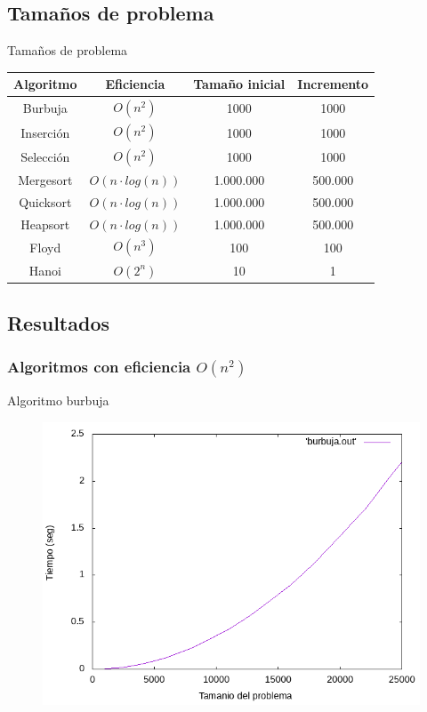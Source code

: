 \documentclass{beamer}
\begin{document}
\subsection{Tamaños de problema}
\begin{frame}[fragile]{Tamaños de problema}
\begin{table}[H]
\centering
\begin{tabular}{|c|c|c|c|}
\hline
\textbf{Algoritmo} & \textbf{Eficiencia} & \textbf{Tamaño inicial} & \textbf{Incremento}\\
\hline
Burbuja & $O(n^2)$ & 1000 & 1000 \\
\hline
Inserción & $O(n^2)$ & 1000 & 1000 \\
\hline
Selección & $O(n^2)$ & 1000 & 1000 \\
\hline
Mergesort & $O(n \cdot log(n))$ & 1.000.000 & 500.000 \\
\hline
Quicksort & $O(n \cdot log(n))$ & 1.000.000 & 500.000 \\
\hline
Heapsort & $O(n \cdot log(n))$ & 1.000.000 & 500.000 \\
\hline
Floyd & $O(n^3)$ & 100 & 100 \\
\hline
Hanoi & $O(2^n)$ & 10 & 1 \\
\hline
\end{tabular}
\end{table}
\end{frame}
\subsection{Resultados}

\subsubsection{Algoritmos con eficiencia $O(n^2)$}

\begin{frame}[fragile]{Algoritmo burbuja}
\begin{figure}[H]
\centering
\includegraphics[scale=0.5]{empirica_burbuja.png}
\end{figure}
\end{frame}
\end{document}
